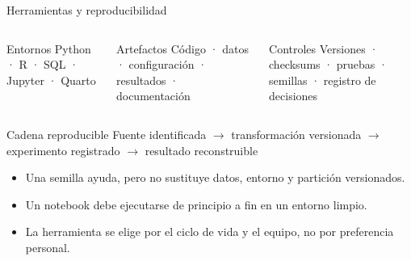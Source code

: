 \documentclass[aspectratio=169,11pt]{beamer}
\begin{document}
\begin{frame}{Herramientas y reproducibilidad}
  \begin{columns}[T]
      \begin{block}{Entornos}
        Python · R · SQL · Jupyter · Quarto
      \end{block}
      \begin{block}{Artefactos}
        Código · datos · configuración · resultados · documentación
      \end{block}
      \begin{block}{Controles}
        Versiones · checksums · pruebas · semillas · registro de decisiones
      \end{block}
  \end{columns}
  \vspace{0.6em}
  \begin{block}{Cadena reproducible}
    \centering Fuente identificada $\rightarrow$ transformación versionada $\rightarrow$ experimento registrado $\rightarrow$ resultado reconstruible
  \end{block}
  \begin{itemize}
    \item Una semilla ayuda, pero no sustituye datos, entorno y partición versionados.
    \item Un notebook debe ejecutarse de principio a fin en un entorno limpio.
    \item La herramienta se elige por el ciclo de vida y el equipo, no por preferencia personal.
  \end{itemize}
\end{frame}
\end{document}

